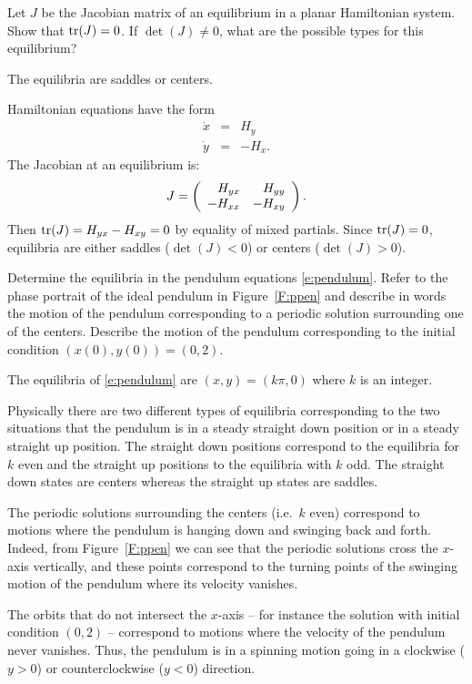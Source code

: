 \documentclass{ximera}
\begin{document}
\begin{exercise} \label{c14.7.8}
Let $J$ be the Jacobian matrix of an equilibrium in a planar Hamiltonian 
system. Show that ${\rm tr}(J)=0$.  If $\det(J)\neq 0$, what are the possible
types for this equilibrium?

\begin{solution}
\ans The equilibria are saddles or centers.

\soln  Hamiltonian equations have the form 
\begin{eqnarray*}
\dot{x} & = & H_y \\
\dot{y} & = & -H_x.
\end{eqnarray*}
The Jacobian at an equilibrium is:
\[
J = \left(\begin{array}{rr} H_{yx} & H_{yy}\\ -H_{xx} &-H_{xy}\end{array}\right).
\]
Then ${\rm tr}(J)=H_{yx}-H_{xy}=0$ by equality of mixed partials.  Since 
${\rm tr}(J)=0$, equilibria are either saddles ($\det(J)<0$) or centers
($\det(J)>0$).



\end{solution}
\end{exercise}

\begin{exercise} \label{c14.7.9}
Determine the equilibria in the pendulum equations \eqref{e:pendulum}.
Refer to the phase portrait of the ideal pendulum in Figure~\ref{F:ppen}
and describe in words the motion of the pendulum corresponding to a periodic 
solution surrounding one of the centers.  Describe the motion of the 
pendulum corresponding to the initial condition $(x(0),y(0))=(0,2)$.

\begin{solution}
\ans The equilibria of \eqref{e:pendulum} are
$(x,y)=(k\pi,0)$ where $k$ is an integer.

\soln Physically there are two different types of equilibria corresponding
to the two situations that the pendulum is in a steady straight down
position or in a steady straight up position.  The straight down
positions correspond to the equilibria for $k$ even and the straight
up positions to the equilibria with $k$ odd.  The straight down
states are centers whereas the straight up states are saddles.

The periodic solutions surrounding the centers (i.e.\ $k$ even) correspond to 
motions where the pendulum is hanging down and swinging back and forth.
Indeed, from Figure~\ref{F:ppen} we can see that the periodic solutions
cross the $x$-axis vertically, and these points correspond to the turning
points of the swinging motion of the pendulum where its velocity vanishes.

The orbits that do not intersect the $x$-axis -- for instance the
solution with initial condition $(0,2)$ -- correspond to motions where
the velocity of the pendulum never vanishes.  Thus, the pendulum is
in a spinning motion going in a clockwise ($y>0$) or counterclockwise
($y<0$) direction.



\end{solution}
\end{exercise}
\end{document}

